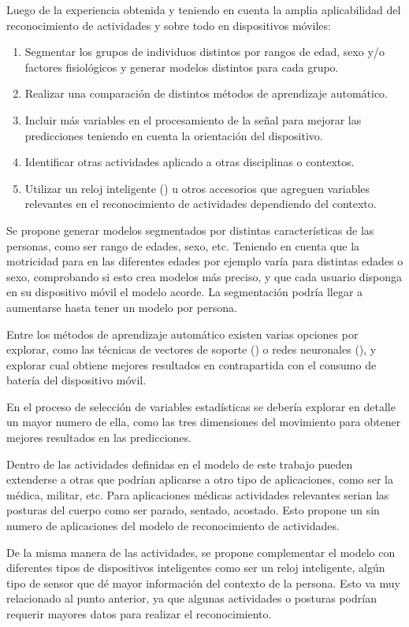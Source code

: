 Luego de la experiencia obtenida y teniendo en cuenta la amplia aplicabilidad
del reconocimiento de actividades y sobre todo en dispositivos móviles:
\begin{enumerate}
\item Segmentar los grupos de individuos distintos por rangos de edad, sexo
y/o factores fisiológicos y generar modelos distintos para cada grupo. 
\item Realizar una comparación de distintos métodos de aprendizaje automático. 
\item Incluir más variables en el procesamiento de la señal para mejorar
las predicciones teniendo en cuenta la orientación del dispositivo. 
\item Identificar otras actividades aplicado a otras disciplinas o contextos. 
\item Utilizar un reloj inteligente () u otros accesorios
que agreguen variables relevantes en el reconocimiento de actividades
dependiendo del contexto. 
\end{enumerate}
Se propone generar modelos segmentados por distintas características
de las personas, como ser rango de edades, sexo, etc. Teniendo en
cuenta que la motricidad para en las diferentes edades por ejemplo
varía para distintas edades o sexo, comprobando si esto crea modelos
más preciso, y que cada usuario disponga en su dispositivo móvil el
modelo acorde. La segmentación podría llegar a aumentarse hasta tener
un modelo por persona.

Entre los métodos de aprendizaje automático existen varias opciones
por explorar, como las técnicas de vectores de soporte ()
o redes neuronales (), y explorar cual obtiene mejores
resultados en contrapartida con el consumo de batería del dispositivo
móvil.

En el proceso de selección de variables estadísticas se debería explorar
en detalle un mayor numero de ella, como las tres dimensiones del
movimiento para obtener mejores resultados en las predicciones. 

Dentro de las actividades definidas en el modelo de este trabajo pueden
extenderse a otras que podrían aplicarse a otro tipo de aplicaciones,
como ser la médica, militar, etc. Para aplicaciones médicas actividades
relevantes serian las posturas del cuerpo como ser parado, sentado,
acostado. Esto propone un sin numero de aplicaciones del modelo de
reconocimiento de actividades. 

De la misma manera de las actividades, se propone complementar el
modelo con diferentes tipos de dispositivos inteligentes como ser
un reloj inteligente, algún tipo de sensor que dé mayor información
del contexto de la persona. Esto va muy relacionado al punto anterior,
ya que algunas actividades o posturas podrían requerir mayores datos
para realizar el reconocimiento.
